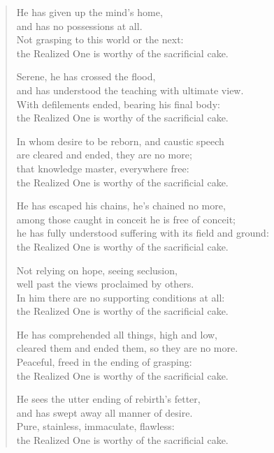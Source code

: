 \documentclass[12pt,openany]{book}%
\begin{document}
\begin{verse}
He has given up the mind’s home, \\
and has no possessions at all. \\
Not grasping to this world or the next: \\
the Realized One is worthy of the sacrificial cake. 

Serene, he has crossed the flood, \\
and has understood the teaching with ultimate view. \\
With defilements ended, bearing his final body: \\
the Realized One is worthy of the sacrificial cake. 

In whom desire to be reborn, and caustic speech \\
are cleared and ended, they are no more; \\
that knowledge master, everywhere free: \\
the Realized One is worthy of the sacrificial cake. 

He has escaped his chains, he’s chained no more, \\
among those caught in conceit he is free of conceit; \\
he has fully understood suffering with its field and ground: \\
the Realized One is worthy of the sacrificial cake. 

Not relying on hope, seeing seclusion, \\
well past the views proclaimed by others. \\
In him there are no supporting conditions at all: \\
the Realized One is worthy of the sacrificial cake. 

He has comprehended all things, high and low, \\
cleared them and ended them, so they are no more. \\
Peaceful, freed in the ending of grasping: \\
the Realized One is worthy of the sacrificial cake. 

He sees the utter ending of rebirth’s fetter, \\
and has swept away all manner of desire. \\
Pure, stainless, immaculate, flawless: \\
the Realized One is worthy of the sacrificial cake. 


\end{verse}
\end{document}

